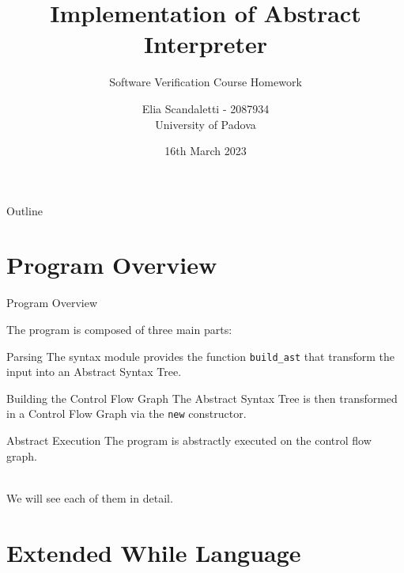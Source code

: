 \documentclass{beamer}
\title{Implementation of Abstract Interpreter}
\subtitle{Software Verification Course Homework}
\author[E. Scandaletti]{Elia Scandaletti\texorpdfstring{ - 2087934\\University of Padova}{}}
\date[13/02/2023]{16th March 2023}
\begin{document}
\begin{frame}
    \titlepage
\end{frame}

\begin{frame}{Outline}
    \tableofcontents
\end{frame}

\section{Program Overview}

\begin{frame}{Program Overview}

    The program is composed of three main parts:

    \begin{block}{Parsing}
        The syntax module provides the function \texttt{build\_ast} that transform the input into an Abstract Syntax Tree.
    \end{block}

    \begin{block}{Building the Control Flow Graph}
        The Abstract Syntax Tree is then transformed in a Control Flow Graph via the \texttt{new} constructor.
    \end{block}

    \begin{block}{Abstract Execution}
        The program is abstractly executed on the control flow graph.
    \end{block}

    ~\\
    We will see each of them in detail.

\end{frame}

\section{Extended While Language}
\end{document}
